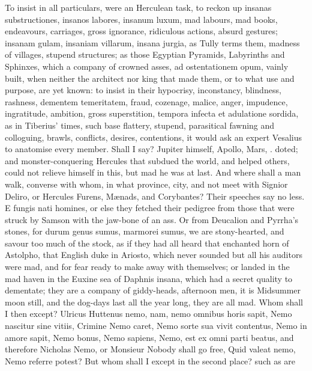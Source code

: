 {To insist in all particulars, were an Herculean task, to
reckon up insanas substructiones, insanos labores, insanum
luxum, mad labours, mad books, endeavours, carriages, gross ignorance,
ridiculous actions, absurd gestures; insanam gulam, insaniam villarum,
insana jurgia, as Tully terms them, madness of villages, stupend
structures; as those Egyptian Pyramids, Labyrinths and Sphinxes, which
a company of crowned asses, ad ostentationem opum, vainly built, when
neither the architect nor king that made them, or to what use and
purpose, are yet known: to insist in their hypocrisy, inconstancy,
blindness, rashness, dementem temeritatem, fraud, cozenage, malice,
anger, impudence, ingratitude, ambition, gross superstition,
tempora infecta et adulatione sordida, as in Tiberius' times, such
base flattery, stupend, parasitical fawning and colloguing, \etc{} brawls,
conflicts, desires, contentions, it would ask an expert Vesalius to
anatomise every member. Shall I say? Jupiter himself, Apollo, Mars, \etc.
doted; and monster-conquering Hercules that subdued the world, and
helped others, could not relieve himself in this, but mad he was at
last. And where shall a man walk, converse with whom, in what province,
city, and not meet with Signior Deliro, or Hercules Furens, M\ae{}nads,
and Corybantes? Their speeches say no less. E fungis nati homines,
or else they fetched their pedigree from those that were struck by
Samson with the jaw-bone of an ass. Or from Deucalion and Pyrrha's
stones, for durum genus sumus,  marmorei sumus, we are
stony-hearted, and savour too much of the stock, as if they had all
heard that enchanted horn of Astolpho, that English duke in Ariosto,
which never sounded but all his auditors were mad, and for fear ready
to make away with themselves; or landed in the mad haven in the
Euxine sea of Daphnis insana, which had a secret quality to dementate;
they are a company of giddy-heads, afternoon men, it is Midsummer moon
still, and the dog-days last all the year long, they are all mad. Whom
shall I then except? Ulricus Huttenus nemo, nam, nemo omnibus
horis sapit, Nemo nascitur sine vitiis, Crimine Nemo caret, Nemo sorte
sua vivit contentus, Nemo in amore sapit, Nemo bonus, Nemo sapiens,
Nemo, est ex omni parti beatus, \etc{} and therefore Nicholas Nemo,
or Monsieur Nobody shall go free, Quid valeat nemo, Nemo referre
potest? But whom shall I except in the second place? such as are
}
